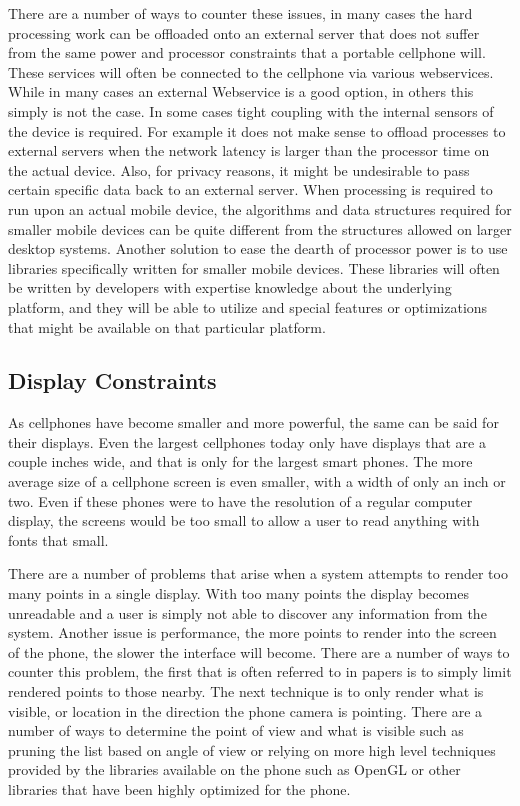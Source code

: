 \documentclass{acm_proc_article-sp}
\begin{document}
There are a number of ways to counter these issues, in many cases the hard processing work can be offloaded onto an external server that does not suffer from the same power and processor constraints that a portable cellphone will. These services will often be connected to the cellphone via various webservices. While in many cases an external Webservice is a good option, in others this simply is not the case. In some cases tight coupling with the internal sensors of the device is required.  For example it does not make sense to offload processes to external servers when the network latency is larger than the processor time on the actual device.  Also, for privacy reasons, it might be undesirable to pass certain specific data back to an external server. When processing is required to run upon an actual mobile device, the algorithms and data structures required for smaller mobile devices can be quite different from the structures allowed on larger desktop systems.  \cite{wagner2009making} Another solution to ease the dearth of processor power is to use libraries specifically written for smaller mobile devices.  These libraries will often be written by developers with expertise knowledge about the underlying platform, and they will be able to utilize and special features or optimizations that might be available on that particular platform.  

\subsection{Display Constraints}
As cellphones have become smaller and more powerful, the same can be said for their displays.  Even the largest cellphones today only have displays that are a couple inches wide, and that is only for the largest smart phones.  The more average size of a cellphone screen is even smaller, with a width of only an inch or two.  Even if these phones were to have the resolution of a regular computer display, the screens would be too small to allow a user to read anything with fonts that small.

There are a number of problems that arise when a system attempts to render too many points in a single display.  With too many points the display becomes unreadable and a user is simply not able to discover any information from the system.  Another issue is performance, the more points to render into the screen of the phone, the slower the interface will become.  There are a number of ways to counter this problem, the first that is often referred to in papers is to simply limit rendered points to those nearby.  \cite{pombinholocation} The next technique is to only render what is visible, or location in the direction the phone camera is pointing.  There are a number of ways to determine the point of view and what is visible such as pruning the list based on angle of view or relying on more high level techniques provided by the libraries available on the phone such as OpenGL or other libraries that have been highly optimized for the phone.  
\end{document}
